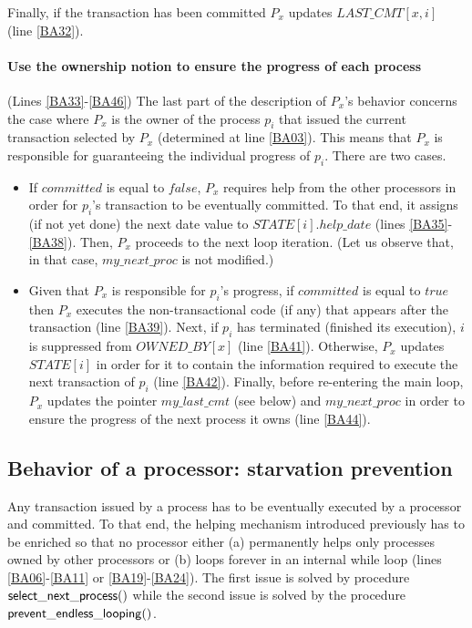 Finally, if the transaction has been committed
$P_x$ updates  $\mathit{LAST\_CMT}[x,i]$  (line \ref{BA32}).


\paragraph{Use the ownership notion to ensure the progress of each process} 
(Lines \ref{BA33}-\ref{BA46}) 
The last part of the description of $P_x$'s behavior  concerns the 
case where  $P_x$ is the owner of the process $p_i$ that issued the 
current transaction selected by $P_x$ (determined at line \ref{BA03}). 
This means that $P_x$ is responsible for guaranteeing the individual 
progress of $p_i$.  There are two cases. 
%
\begin{itemize}
\item
If $committed$ is  equal to $\mathit{false}$, $P_x$ requires help 
from the other processors in order for $p_i$'s transaction to be eventually 
committed. To that end, it assigns (if not yet done) the next date value 
to $\mathit{STATE}[i].help\_date$  (lines \ref{BA35}-\ref{BA38}). 
Then, $P_x$ proceeds to  the next loop iteration.
(Let us observe that, in that case, $my\_next\_proc$ is not  modified.)
%
\item
Given that $P_x$ is responsible for  $p_i$'s progress, 
if $committed$ is  equal to $\mathit{true}$ then $P_x$ executes the  
non-transactional code
(if any) that appears after the transaction (line \ref{BA39}).
Next, if  $p_i$ has terminated (finished its execution), $i$ is 
suppressed from $\mathit{OWNED\_BY}[x]$
(line \ref{BA41}). Otherwise, $P_x$ updates $\mathit{STATE}[i]$ 
in order for it 
to contain the information required to execute the next transaction of $p_i$ 
(line \ref{BA42}). 
%
Finally, before re-entering the main loop, $P_x$ 
updates the pointer  $my\_last\_cmt$ (see below) and 
$my\_next\_proc$ in order to ensure the progress of the next 
process it owns (line \ref{BA44}). 
\end{itemize}

\subsection{Behavior of a processor:  starvation prevention}
\label{sec:starvation-prevention}

Any transaction issued by a process has to be eventually executed 
by  a processor and  committed. 
To that end, the helping mechanism introduced previously has 
 to be enriched so that  no processor either (a) permanently helps  only
 processes owned by other processors or (b) loops forever in an internal 
while loop (lines \ref{BA06}-\ref{BA11} or \ref{BA19}-\ref{BA24}).
The first issue is solved by  procedure ${\sf select\_next\_process}()$
while the second issue is solved by the procedure 
${\sf prevent\_endless\_looping}()$.  

